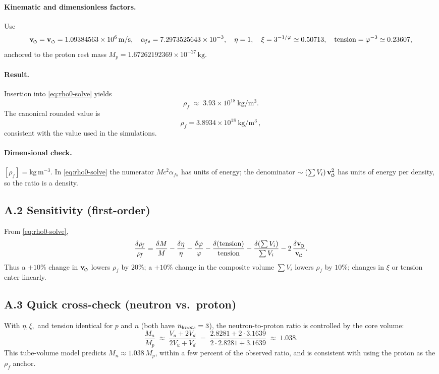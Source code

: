 \documentclass[smallextended]{svjour3}       %
\newcommand{\swirlarrow}{%
	\mathchoice{\mkern-2mu\scriptstyle\boldsymbol{\circlearrowleft}}%
	{\mkern-2mu\scriptstyle\boldsymbol{\circlearrowleft}}%
	{\mkern-2mu\scriptscriptstyle\boldsymbol{\circlearrowleft}}%
	{\mkern-2mu\scriptscriptstyle\boldsymbol{\circlearrowleft}}%
}
\newcommand{\vswirl}{\mathbf{v}_{\swirlarrow}}
\newcommand{\rhoF}{\rho_{\!f}}      %
\begin{document}
	\paragraph{Kinematic and dimensionless factors.}
	Use
	\[
		\vswirl = \mathbf{v}_{\scriptscriptstyle\boldsymbol{\circlearrowleft}} = 1.09384563\times10^6\,\mathrm{m/s},\quad
		\alpha_{\!fs}=7.2973525643\times10^{-3},\quad
		\eta=1,\quad \xi = 3^{-1/\varphi}\simeq 0.50713,\quad
		\text{tension} = \varphi^{-3} \simeq 0.23607,
	\]
	anchored to the proton rest mass \(M_p=1.67262192369\times10^{-27}\,\mathrm{kg}\).

	\paragraph{Result.}
	Insertion into \eqref{eq:rho0-solve} yields
	\[
		\rhoF \;\approx\; 3.93\times 10^{18}\ \mathrm{kg/m^3}.
	\]
	The canonical rounded value is
	\[
		\boxed{ \rhoF = 3.8934\times 10^{18}\ \mathrm{kg/m^3} }\,,
	\]
	consistent with the value used in the simulations.

	\paragraph{Dimensional check.}
	\([\rhoF]=\mathrm{kg\,m^{-3}}\).
	In \eqref{eq:rho0-solve} the numerator \(M c^2\alpha_{\!fs}\) has units of energy; the denominator
	\(\sim (\sum V_i)\,\vswirl^{2}\) has units of energy per density, so the ratio is a density.

	\subsection*{A.2 Sensitivity (first-order)}
	From \eqref{eq:rho0-solve},
	\[
		\frac{\delta\rhoF}{\rhoF}
		= \frac{\delta M}{M}
		- \frac{\delta\eta}{\eta}
		- \frac{\delta\varphi}{\varphi}
		- \frac{\delta(\text{tension})}{\text{tension}}
		- \frac{\delta(\sum V_i)}{\sum V_i}
		- 2\,\frac{\delta \vswirl}{\vswirl}.
	\]
	Thus a \(+10\%\) change in \(\vswirl\) lowers \(\rhoF\) by \(20\%\); a \(+10\%\) change in the composite volume \(\sum V_i\) lowers \(\rhoF\) by \(10\%\); changes in \(\xi\) or tension enter linearly.

	\subsection*{A.3 Quick cross-check (neutron vs.\ proton)}
	With \(\eta,\xi,\) and tension identical for \(p\) and \(n\) (both have \(n_{\textrm knots}=3\)),
	the neutron-to-proton ratio is controlled by the core volume:
	\[
		\frac{M_n}{M_p}\;\approx\;\frac{V_u + 2V_d}{2V_u + V_d}
		\;=\; \frac{2.8281 + 2\cdot 3.1639}{2\cdot 2.8281 + 3.1639}
		\;\approx\; 1.038.
	\]
	This tube-volume model predicts \(M_n \approx 1.038\,M_p\), within a few percent of the observed ratio, and is consistent with using the proton as the \(\rhoF\) anchor.
\end{document}

